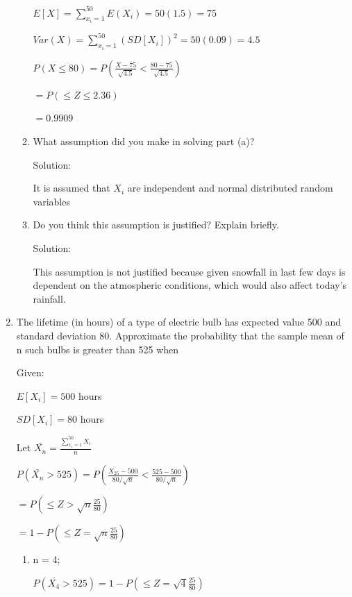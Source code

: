 \documentclass{article}
\begin{document}
\begin{enumerate}
\begin{enumerate}
        $E[X] = \displaystyle \sum_{x_i = 1}^{50} {E(X_i)} = 50(1.5) = 75$

        $Var(X) = \displaystyle \sum_{x_i = 1}^{50} {(SD[X_i])^2 = 50(0.09) = 4.5}$
    
        $\displaystyle P(X \leq 80) = P\left(\frac{X - 75}{\sqrt{4.5}}<\frac{80 - 75}{\sqrt{4.5}}\right)$

        $= \displaystyle P\left(\leq Z \leq 2.36 \right)$
    
        $=0.9909$
        \item What assumption did you make in solving part (a)?
        
        Solution:

        It is assumed that $X_i$ are independent and normal distributed random variables
        
        \item Do you think this assumption is justified? Explain briefly.
        
        Solution:

        This assumption is not justified because given snowfall in last few days is dependent on the atmospheric conditions, which would also affect today's rainfall.
    \end{enumerate}
    \item  The lifetime (in hours) of a type of electric bulb has expected value 500 and standard deviation 80. 
    Approximate the probability that the sample mean of n such bulbs is greater than 525 when
       
    Given:

        $E[X_i] = 500$ hours

        $SD[X_i] = 80$ hours

        Let $\bar{X_n} = \displaystyle \frac{\sum_{x_i = 1}^{50} {X_i}}{n}$
    
        $\displaystyle P(\bar{X_n} > 525) = P\left(\frac{\bar{X_{25}} - 500}{80/\sqrt{n}}<\frac{525 - 500}{80/\sqrt{n}}\right)$

        $= \displaystyle P\left(\leq Z > \sqrt{n}\frac{25}{80}\right)$
    
        $=1 - P\left(\leq Z = \sqrt{n}\frac{25}{80}\right)$

    \begin{enumerate}
        \item n = 4;

         $\displaystyle P(\bar{X_4} > 525) = 1 - P\left(\leq Z = \sqrt{4}\frac{25}{80}\right)$
         

\end{enumerate}
\end{enumerate}
\end{document}
